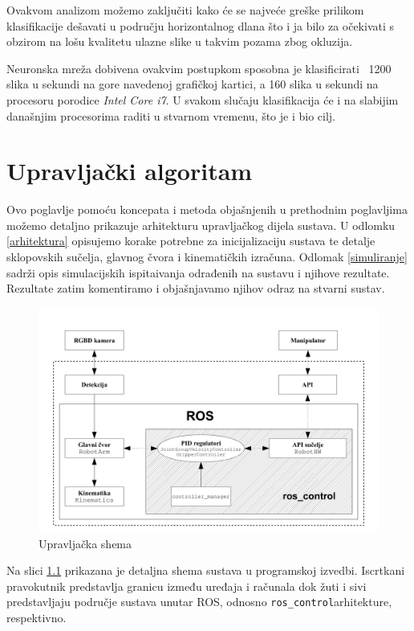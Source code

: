 \documentclass[times, utf8, diplomski, numeric]{fer}
\begin{document}
Ovakvom analizom možemo zaključiti kako će se najveće greške prilikom klasifikacije dešavati u području horizontalnog dlana što i ja bilo za očekivati s obzirom na lošu kvalitetu ulazne slike u takvim pozama zbog okluzija.

Neuronska mreža dobivena ovakvim postupkom sposobna je klasificirati ~1200 slika u sekundi na gore navedenoj grafičkoj kartici, a 160 slika u sekundi na procesoru porodice \textit{Intel Core i7}. U svakom slučaju klasifikacija će i na slabijim današnjim procesorima raditi u stvarnom vremenu, što je i bio cilj.

\chapter{Upravljački algoritam}\label{Upravljački algoritam}
Ovo poglavlje pomoću koncepata i metoda objašnjenih u prethodnim poglavljima možemo detaljno prikazuje arhitekturu upravljačkog dijela sustava.
U odlomku \ref{arhitektura} opisujemo korake potrebne za inicijalizaciju sustava te detalje sklopovskih sučelja, glavnog čvora i kinematičkih izračuna.
Odlomak \ref{simuliranje} sadrži opis simulacijskih ispitaivanja odrađenih na sustavu i njihove rezultate.
Rezultate zatim komentiramo i objašnjavamo njihov odraz na stvarni sustav.

\begin{figure}[h!]
\centering
\includegraphics[width=\textwidth]{upr_shema}
\caption{Upravljačka shema}\label{upr_shm}
\end{figure}

Na slici \ref{upr_shm} prikazana je detaljna shema sustava u programskoj izvedbi.
Iscrtkani pravokutnik predstavlja granicu između uređaja i računala dok žuti i sivi predstavljaju područje sustava unutar ROS, odnosno \texttt{ros\_control}arhitekture, respektivno.
\end{document}
